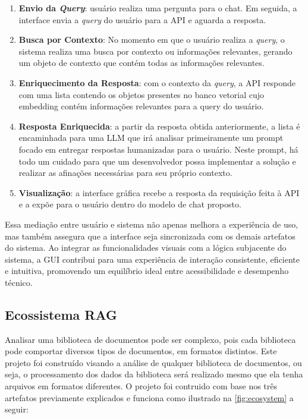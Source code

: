 \documentclass[a4paper, 12pt]{article}
\begin{document}
    \begin{enumerate}
        \item \textbf{Envio da \textit{Query}}: usuário realiza uma pergunta para o chat. Em seguida, a interface envia a \textit{query} do usuário para a API e aguarda a resposta.
        \item \textbf{Busca por Contexto}: No momento em que o usuário realiza a \textit{query}, o sistema realiza uma busca por contexto ou informações relevantes, gerando um objeto de contexto que contém todas as informações relevantes.
        \item \textbf{Enriquecimento da Resposta}: com o contexto da \textit{query}, a API responde com uma lista contendo os objetos presentes no banco vetorial cujo embedding contém informações relevantes para a query do usuário.
        \item \textbf{Resposta Enriquecida}: a partir da resposta obtida anteriormente, a lista é encaminhada para uma LLM que irá analisar primeiramente um prompt focado em entregar respostas humanizadas para o usuário. Neste prompt, há todo um cuidado para que um desenvolvedor possa implementar a solução e realizar as afinações necessárias para seu próprio contexto.
        \item \textbf{Visualização}: a interface gráfica recebe a resposta da requisição feita à API e a expõe para o usuário dentro do modelo de chat proposto.
    \end{enumerate}

    Essa mediação entre usuário e sistema não apenas melhora a experiência de uso, mas também assegura que a interface seja sincronizada com os demais artefatos do sistema. Ao integrar as funcionalidades visuais com a lógica subjacente do sistema, a GUI contribui para uma experiência de interação consistente, eficiente e intuitiva, promovendo um equilíbrio ideal entre acessibilidade e desempenho técnico.
    
    \subsection{Ecossistema RAG} \label{sec:ecosystem}
    
    Analisar uma biblioteca de documentos pode ser complexo, pois cada biblioteca pode comportar diversos tipos de documentos, em formatos distintos. Este projeto foi construído visando a análise de qualquer biblioteca de documentos, ou seja, o processamento dos dados da biblioteca será realizado mesmo que ela tenha arquivos em formatos diferentes. O projeto foi contruido com base nos três artefatos previamente explicados e funciona como ilustrado na \autoref{fig:ecosystem} a seguir:
\end{document}
